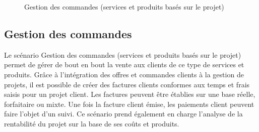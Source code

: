 \begin{figure}[H]
    \label{fig-service-reparation}
    \noindent{}
    \caption{Gestion des commandes (services et produits basés sur le projet)}
\end{figure}

\subsection{Gestion des commandes}

Le scénario Gestion des commandes (services et produits basés sur le projet) permet de gérer
de bout en bout la vente aux clients de ce type de services et produits. Grâce à l'intégration des offres et commandes clients à la gestion de projets, il est possible de créer des factures clients conformes aux temps et frais saisis pour un projet client. Les factures peuvent être établies sur une base réelle, forfaitaire ou mixte. Une fois la facture client émise, les paiements client peuvent faire l'objet d'un suivi. 
Ce scénario prend également en charge l'analyse de la rentabilité du projet sur la base de ses coûts et produits. \\

